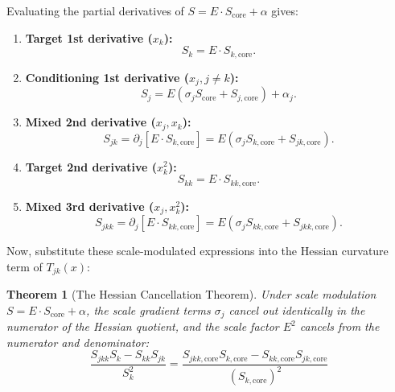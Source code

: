 \documentclass[11pt,a4paper]{article}
\theoremstyle{plain}
\newtheorem{theorem}{Theorem}[section]
\theoremstyle{definition}
\theoremstyle{remark}
\begin{document}
Evaluating the partial derivatives of $S = E \cdot S_{\text{core}} + \alpha$ gives:
\begin{enumerate}
    \item \textbf{Target 1st derivative ($x_k$):}
    \begin{equation}
        S_k = E \cdot S_{k, \text{core}}.
    \end{equation}
    \item \textbf{Conditioning 1st derivative ($x_j, j \neq k$):}
    \begin{equation}
        S_j = E \left( \sigma_j S_{\text{core}} + S_{j, \text{core}} \right) + \alpha_j.
    \end{equation}
    \item \textbf{Mixed 2nd derivative ($x_j, x_k$):}
    \begin{equation}
        S_{jk} = \partial_j [E \cdot S_{k, \text{core}}] = E \left( \sigma_j S_{k, \text{core}} + S_{jk, \text{core}} \right).
    \end{equation}
    \item \textbf{Target 2nd derivative ($x_k^2$):}
    \begin{equation}
        S_{kk} = E \cdot S_{kk, \text{core}}.
    \end{equation}
    \item \textbf{Mixed 3rd derivative ($x_j, x_k^2$):}
    \begin{equation}
        S_{jkk} = \partial_j [E \cdot S_{kk, \text{core}}] = E \left( \sigma_j S_{kk, \text{core}} + S_{jkk, \text{core}} \right).
    \end{equation}
\end{enumerate}

Now, substitute these scale-modulated expressions into the Hessian curvature term of $T_{jk}(x)$:

\begin{theorem}[The Hessian Cancellation Theorem]
\label{thm:hessian_cancellation}
Under scale modulation $S = E \cdot S_{\text{core}} + \alpha$, the scale gradient terms $\sigma_j$ cancel out identically in the numerator of the Hessian quotient, and the scale factor $E^2$ cancels from the numerator and denominator:
\begin{equation}
    \boxed{\frac{S_{jkk} S_k - S_{kk} S_{jk}}{S_k^2} = \frac{S_{jkk, \text{core}} S_{k, \text{core}} - S_{kk, \text{core}} S_{jk, \text{core}}}{(S_{k, \text{core}})^2}}
    \label{eq:hessian_cancellation_result}
\end{equation}
\end{theorem}
\end{document}
